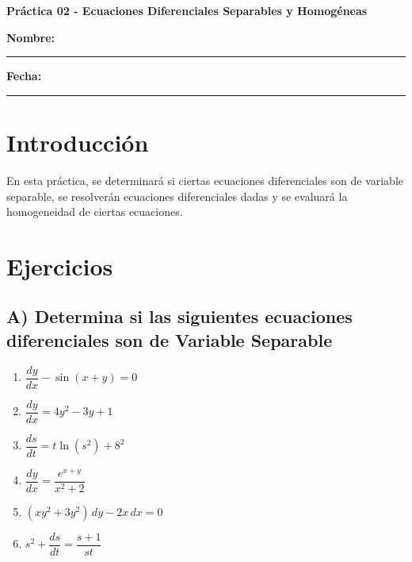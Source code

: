 \documentclass[a4paper,12pt]{article}
\begin{document}
\begin{center}
    \Large\textbf{Práctica 02 - Ecuaciones Diferenciales Separables y Homogéneas}\\[1cm]  

\end{center}
  \textbf{Nombre:} \rule{9cm}{0.4pt}  \textbf{Fecha:} \rule{4.5cm}{0.4pt}
\section*{Introducción}
\large
En esta práctica, se determinará si ciertas ecuaciones diferenciales son de variable separable, se resolverán ecuaciones diferenciales dadas y se evaluará la homogeneidad de ciertas ecuaciones.

\section*{Ejercicios}
\large

\subsection*{A) Determina si las siguientes ecuaciones diferenciales son de Variable Separable}
\begin{multicols}{2}
\begin{enumerate}
    \item $\dfrac{dy}{dx} - \sin(x + y) = 0$
    \item $\dfrac{dy}{dx} = 4y^2 - 3y + 1$
    \item $\dfrac{ds}{dt} = t \ln(s^2) + 8^2$
    \item $\dfrac{dy}{dx} = \dfrac{e^{x + y}}{x^2 + 2}$
    \item $(xy^2 + 3y^2) \, dy - 2x \, dx = 0$
    \item $s^2 + \dfrac{ds}{dt} = \dfrac{s + 1}{st}$
\end{enumerate}
\end{multicols}
\end{document}
